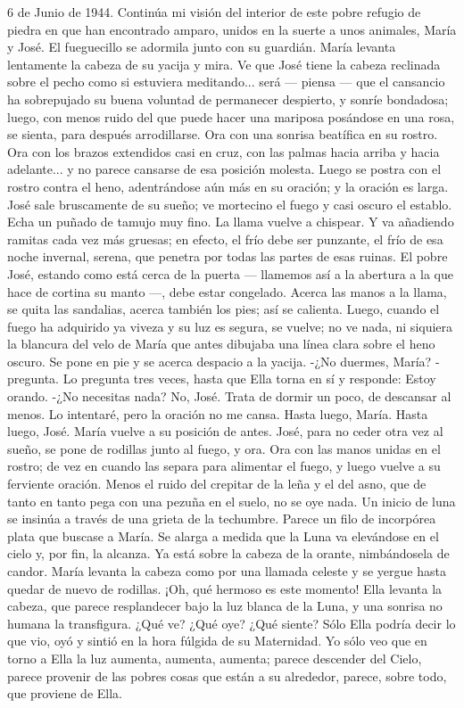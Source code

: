 \documentclass[12pt]{book} %
\begin{document}
6 de Junio de 1944. 
Continúa mi visión del interior de este pobre refugio de piedra en que han encontrado amparo, unidos en la suerte a 
unos animales, María y José. 
El fueguecillo se adormila junto con su guardián. María levanta lentamente la cabeza de su yacija y mira. Ve que José tiene la cabeza reclinada sobre el pecho como si estuviera meditando... será — piensa — que el cansancio ha sobrepujado su buena voluntad de permanecer despierto, y sonríe bondadosa; luego, con menos ruido del que puede hacer una mariposa posándose en una rosa, se sienta, para después arrodillarse. Ora con una sonrisa beatífica en su rostro. Ora con los brazos extendidos casi en cruz, con las palmas hacia arriba y hacia adelante... y no parece cansarse de esa posición molesta. Luego se postra con el rostro contra el heno, adentrándose aún más en su oración; y la oración es larga. 
José sale bruscamente de su sueño; ve mortecino el fuego y casi oscuro el establo. Echa un puñado de tamujo muy fino. La llama vuelve a chispear. Y va añadiendo ramitas cada vez más gruesas; en efecto, el frío debe ser punzante, el frío de esa noche invernal, serena, que penetra por todas las partes de esas ruinas. El pobre José, estando como está cerca de la puerta — llamemos así a la abertura a la que hace de cortina su manto —, debe estar congelado. Acerca las manos a la llama, se quita las sandalias, acerca también los pies; así se calienta. Luego, cuando el fuego ha adquirido ya viveza y su luz es segura, se vuelve; no ve nada, ni siquiera la blancura del velo de María que antes dibujaba una línea clara sobre el heno oscuro. Se pone en pie y se acerca despacio a la yacija. 
-¿No duermes, María? - pregunta. 
Lo pregunta tres veces, hasta que Ella torna en sí y responde: 
Estoy orando. 
-¿No necesitas nada? 
No, José. 
Trata de dormir un poco, de descansar al menos. 
Lo intentaré, pero la oración no me cansa. 
Hasta luego, María. 
Hasta luego, José. 
María vuelve a su posición de antes. José, para no ceder otra vez al sueño, se pone de rodillas junto al fuego, y ora. Ora 
con las manos unidas en el rostro; de vez en cuando las separa para alimentar el fuego, y luego vuelve a su ferviente oración. Menos el ruido del crepitar de la leña y el del asno, que de tanto en tanto pega con una pezuña en el suelo, no se oye nada. 
Un inicio de luna se insinúa a través de una grieta de la techumbre. Parece un filo de incorpórea plata que buscase a María. Se alarga a medida que la Luna va elevándose en el cielo y, por fin, la alcanza. Ya está sobre la cabeza de la orante, nimbándosela de candor. 
María levanta la cabeza como por una llamada celeste y se yergue hasta quedar de nuevo de rodillas. ¡Oh, qué hermoso es este momento! Ella levanta la cabeza, que parece resplandecer bajo la luz blanca de la Luna, y una sonrisa no humana la transfigura. ¿Qué ve? ¿Qué oye? ¿Qué siente? Sólo Ella podría decir lo que vio, oyó y sintió en la hora fúlgida de su Maternidad. Yo sólo veo que en torno a Ella la luz aumenta, aumenta, aumenta; parece descender del Cielo, parece provenir de las pobres cosas que están a su alrededor, parece, sobre todo, que proviene de Ella. 
\end{document}
